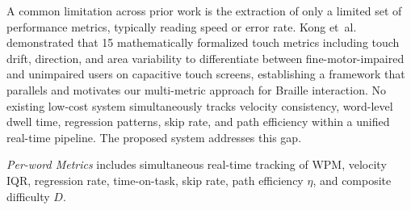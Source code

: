 \documentclass[conference]{IEEEtran}
\begin{document}

    A common limitation across prior work is the extraction of only a
    limited set of performance metrics, typically reading speed or error
    rate. Kong et~al.~\cite{kong2022} demonstrated that 15 mathematically
    formalized touch metrics including touch drift, direction, and area
    variability to differentiate between fine-motor-impaired and unimpaired users on
    capacitive touch screens, establishing a framework that parallels and
    motivates our multi-metric approach for Braille interaction. No
    existing low-cost system simultaneously tracks velocity consistency,
    word-level dwell time, regression patterns, skip rate, and path
    efficiency within a unified real-time pipeline. The proposed system
    addresses this gap.

    \begin{table}[!htp]
    \caption{Comparison of Braille Reading Analysis Systems}
    \label{tab:comparison}
    \begin{center}
    \end{center}
    {\footnotesize \textit{Per-word Metrics} includes simultaneous real-time tracking of WPM,
    velocity IQR, regression rate, time-on-task, skip rate, path efficiency $\eta$,
    and composite difficulty $D$.}
    \end{table}
\end{document}
